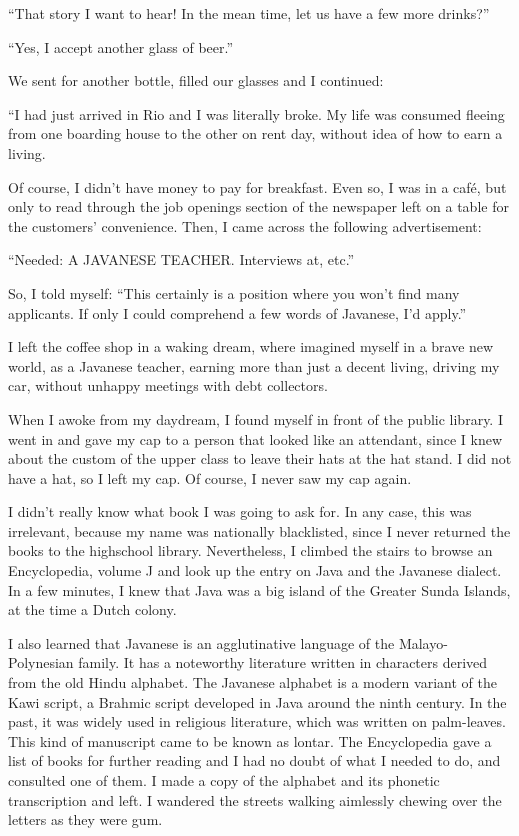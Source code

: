 \documentclass[a4paper,12pt]{book}
\begin{document}
``That story I want to hear! In the mean time,
let us have a few more drinks?''

``Yes, I accept another glass of beer.''

We sent for another bottle, filled our glasses
and I continued:

``I had just arrived in Rio and I was literally broke.
My life was consumed fleeing
from one boarding house to
the other on rent day, without
idea of how to earn a living.

Of course, I didn't have money
to pay for breakfast.
Even so, I was in a café, but only to
read through the job openings section
of the newspaper left on a table
for the customers' convenience. Then, I came across
the following advertisement:


``Needed: A JAVANESE TEACHER.  Interviews at, etc.''

So, I told myself: ``This certainly is a position
where you won't find many applicants. If only I
could comprehend a few words of Javanese,
I'd apply.''

I left the coffee shop in a waking dream,
where imagined myself in a brave new world,
as a Javanese teacher,
earning more than just a decent living,
driving my car,
without unhappy meetings with debt collectors.

When I awoke from my daydream,
I found myself in front of the public library.
I went in and gave my cap to a
person that looked like an attendant,
since I knew about the custom of the
upper class to leave their hats at
the hat stand. I did not have
a hat, so I left my cap. Of course,
I never saw my cap again.

I didn't really know what
book I was going to ask for.
In any case, this was irrelevant,
because my name was nationally blacklisted,
since I never returned the books to
the highschool library. Nevertheless,
I climbed the stairs to browse
an Encyclopedia,
volume J and look up the entry on
Java and the Javanese dialect. 
In a few minutes, I knew that Java was a
big island of the Greater Sunda Islands,
at the time a Dutch colony.

I also learned that Javanese is an agglutinative
language of the Malayo-Polynesian family.
It has a noteworthy literature written in
characters derived from the old Hindu alphabet.
The Javanese alphabet is a modern variant
of the Kawi script, a Brahmic script developed
in Java around the ninth century.
In the past, it was widely used in religious literature,
which was written on palm-leaves.
This kind of manuscript came to be known
as  lontar.
The Encyclopedia gave a list of books for further
reading and I had no doubt of what I needed
to do, and consulted one of them.
I made a copy of the alphabet and its phonetic
transcription and left. I wandered the streets
walking aimlessly chewing over the letters as
they were gum.
\end{document}
